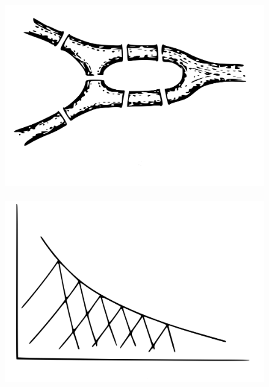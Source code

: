 \documentclass[12pt,oneside]{book}
\begin{document}
\begin{figure}
    \centering
    \includegraphics[height=8cm]{Fig4.jpeg}
    \caption[]{}
    \label{Fig4}
\end{figure}

\begin{figure}
    \centering
    \includegraphics[height=8cm]{Fig5.jpeg}
    \caption{}
    \label{Fig5}
\end{figure}
\end{document}
